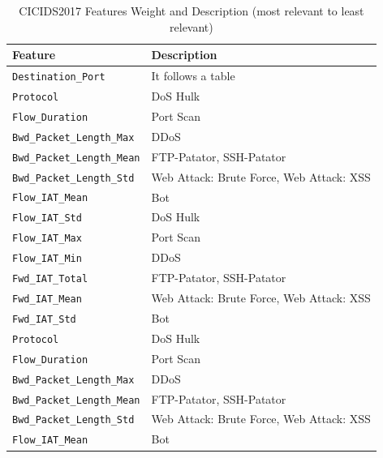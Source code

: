 \begin{table}[h]
    \centering
    \begin{tabular}{l|l}
        \toprule 
        Feature & Description \\
        \midrule
        \rowcolor{black!10} \texttt{Destination\_Port} & It follows a table  \\
        \texttt{Protocol} & DoS Hulk \\
        \rowcolor{black!10} \texttt{Flow\_Duration} & Port Scan \\
        \texttt{Bwd\_Packet\_Length\_Max} & DDoS \\
        \rowcolor{black!10} \texttt{Bwd\_Packet\_Length\_Mean} & FTP-Patator, SSH-Patator \\
        \texttt{Bwd\_Packet\_Length\_Std} & Web Attack: Brute Force, Web Attack: XSS \\
        \rowcolor{black!10} \texttt{Flow\_IAT\_Mean} & Bot \\
        \texttt{Flow\_IAT\_Std} & DoS Hulk \\
        \rowcolor{black!10} \texttt{Flow\_IAT\_Max} & Port Scan \\
        \texttt{Flow\_IAT\_Min} & DDoS \\
        \rowcolor{black!10} \texttt{Fwd\_IAT\_Total} & FTP-Patator, SSH-Patator \\
        \texttt{Fwd\_IAT\_Mean} & Web Attack: Brute Force, Web Attack: XSS \\
        \rowcolor{black!10} \texttt{Fwd\_IAT\_Std} & Bot \\
        \texttt{Protocol} & DoS Hulk \\
        \rowcolor{black!10} \texttt{Flow\_Duration} & Port Scan \\
        \texttt{Bwd\_Packet\_Length\_Max} & DDoS \\
        \rowcolor{black!10} \texttt{Bwd\_Packet\_Length\_Mean} & FTP-Patator, SSH-Patator \\
        \texttt{Bwd\_Packet\_Length\_Std} & Web Attack: Brute Force, Web Attack: XSS \\
        \rowcolor{black!10} \texttt{Flow\_IAT\_Mean} & Bot \\
        \bottomrule
    \end{tabular}
    \caption{CICIDS2017 Features Weight and Description (most relevant to least relevant)}
    \label{tab:features-weight}
\end{table}


